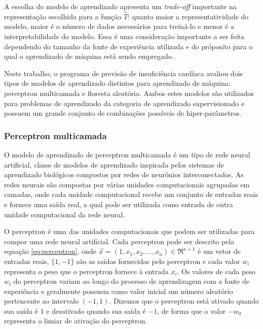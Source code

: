 A escolha do modelo de aprendizado apresenta um \textit{trade-off} importante na representação escolhida para a função $\hat{T}$: quanto maior a representatividade do modelo, maior é o número de dados necessários para treiná-lo\cite[p.8]{machine_learning} e menor é a interpretabilidade do modelo\cite[p.25]{statistical_learning}. Essa é uma consideração importante a ser feita dependendo do tamanho da fonte de experiência utilizada e do próposito para o qual o aprendizado de máquina está sendo empregado.

Neste trabalho, o programa de previsão de insuficiência cardíaca avaliou dois tipos de modelos de aprendizado distintos para aprendizado de máquina: perceptron multicamada e floresta aleatória. Ambos estes modelos são utilizados para problemas de aprendizado da categoria de aprendizado supervisionado e possuem um grande conjunto de combinações possíveis de hiper-parâmetros.

\subsubsection{Perceptron multicamada}

O modelo de aprendizado de perceptron multicamada é um tipo de rede neural artificial, classe de modelos de aprendizado inspirada pelos sistemas de aprendizado biológicos compostos por redes de neurônios interconectados. As redes neurais são compostas por várias unidades computacionais agrupadas em camadas, onde cada unidade computacional recebe um conjunto de entradas reais e fornece uma saída real, a qual pode ser utilizada como entrada de outra unidade computacional da rede neural.\cite[p.82]{machine_learning}

O perceptron é uma das unidades computacionais que podem ser utilizadas para compor uma rede neural artificial. Cada perceptron pode ser descrito pela equação \ref{eq:perceptron}, onde $\vec{x} = (1, x_{1}, x_{2}, ..., x_{n}) \in \Re^{n+1}$ é um vetor de entradas reais, $\{1, -1\}$ são as saídas fornecidas pelo perceptron e cada valor $w_{i}$ representa o peso que o perceptron fornece à entrada $x_{i}$. Os valores de cada peso $w_{i}$ do perceptron variam ao longo do processo de aprendizagem com a fonte de experiência e geralmente possuem como valor inicial um número aleatório pertencente ao intervalo $(-1, 1)$. Dizemos que o perceptron está ativado quando sua saída é $1$ e desativado quando sua saída é $-1$, de forma que o valor $-w_{0}$ representa o limiar de ativação do perceptron.\cite[p.86]{machine_learning}

